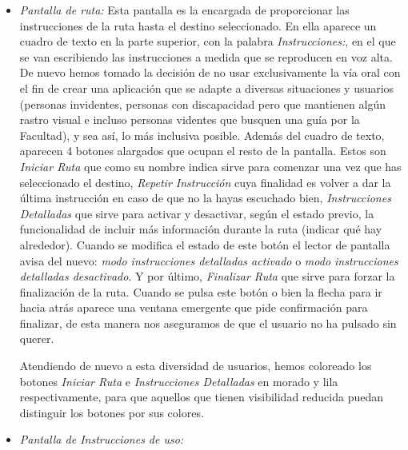\begin{itemize}
	\item \textit{Pantalla de ruta:} Esta pantalla es la encargada de proporcionar las instrucciones de la ruta hasta el destino seleccionado. En ella aparece un cuadro de texto en la parte superior, con la palabra \textit{Instrucciones:}, en el que se van escribiendo las instrucciones a medida que se reproducen en voz alta. De nuevo hemos tomado la decisión de no usar exclusivamente la vía oral con el fin de crear una aplicación que se adapte a diversas situaciones y usuarios (personas invidentes, personas con discapacidad pero que mantienen algún rastro visual e incluso personas videntes que busquen una guía por la Facultad), y sea así, lo más inclusiva posible. Además del cuadro de texto, aparecen 4 botones alargados que ocupan el resto de la pantalla. Estos son \textit{Iniciar Ruta} que como su nombre indica sirve para comenzar una vez que has seleccionado el destino, \textit{Repetir Instrucción} cuya finalidad es volver a dar la última instrucción en caso de que no la hayas escuchado bien, \textit{Instrucciones Detalladas} que sirve para activar y desactivar, según el estado previo, la funcionalidad de incluir más información durante la ruta (indicar qué hay alrededor). Cuando se modifica el estado de este botón el lector de pantalla avisa del nuevo: \textit{modo instrucciones detalladas activado} o \textit{modo instrucciones detalladas desactivado}. Y por último, \textit{Finalizar Ruta} que sirve para forzar la finalización de la ruta. Cuando se pulsa este botón o bien la flecha para ir hacia atrás aparece una ventana emergente que pide confirmación para finalizar, de esta manera nos aseguramos de que el usuario no ha pulsado sin querer. 
	
	Atendiendo de nuevo a esta diversidad de usuarios, hemos coloreado los botones \textit{Iniciar Ruta} e \textit{Instrucciones Detalladas} en morado y lila respectivamente, para que aquellos que tienen visibilidad reducida puedan distinguir los botones por sus colores. 
	
	\item \textit{Pantalla de Instrucciones de uso:} %
\end{itemize}

